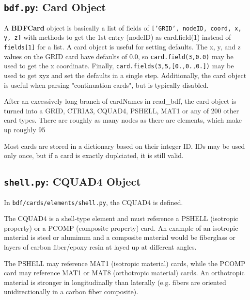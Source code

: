  \subsection{{\tt bdf.py}: Card Object}
     A {\bf BDFCard} object is basically a list of fields of {\tt ['GRID', nodeID, coord, x, y, z]}  with methods to get the 1st entry (nodeID) as card.field(1) instead of {\tt fields[1]} for a list.  A card object is useful for setting defaults.  The x, y, and z values on the GRID card have defaults of 0.0, so {\tt card.field(3,0.0)} may be used to get the x coordinate. Finally, {\tt card.fields(3,5,[0.,0.,0.])} may be used to get xyz and set the defaults in a single step.  Additionally, the card object is useful when parsing "continuation cards", but is typically disabled.

     After an excessively long branch of cardNames in read_bdf, the card object is turned into a GRID, CTRIA3, CQUAD4, PSHELL, MAT1 or any of 200 other card types.  There are roughly as many nodes as there are elements, which make up roughly 95%

     Most cards are stored in a dictionary based on their integer ID.  IDs may be used only once, but if a card is exactly duplciated, it is still valid.

 \subsection{{\tt shell.py}: CQUAD4 Object}
     In {\tt bdf/cards/elements/shell.py}, the CQUAD4 is defined.

     The CQUAD4 is a shell-type element and must reference a PSHELL (isotropic property) or a PCOMP (composite property) card.  An example of an isotropic material is steel or aluminum and a composite material would be fiberglass or layers of carbon fiber/epoxy resin at layed up at different angles.

     The PSHELL may reference MAT1 (isotropic material) cards, while the PCOMP card may reference MAT1 or MAT8 (orthotropic material) cards.  An orthotropic material is stronger in longitudinally than laterally (e.g. fibers are oriented unidirectionally in a carbon fiber composite).

